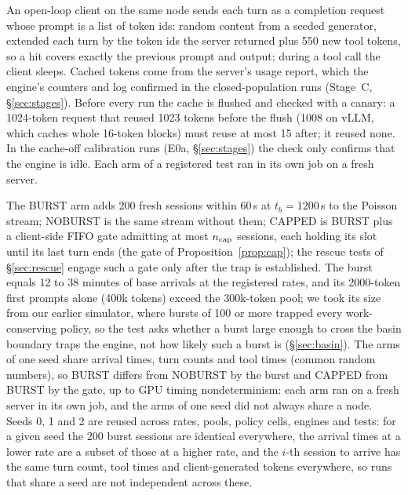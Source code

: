 An open-loop client on the same node sends each turn as a completion request whose prompt is a list of token ids: random content from a seeded generator, extended each turn by the token ids the server returned plus 550 new tool tokens, so a hit covers exactly the previous prompt and output; during a tool call the client sleeps. Cached tokens come from the server's usage report, which the engine's counters and log confirmed in the closed-population runs (Stage~C, \S\ref{sec:stages}). Before every run the cache is flushed and checked with a canary: a 1024-token request that reused 1023 tokens before the flush (1008 on vLLM, which caches whole 16-token blocks) must reuse at most 15 after; it reused none. In the cache-off calibration runs (E0a, \S\ref{sec:stages}) the check only confirms that the engine is idle. Each arm of a registered test ran in its own job on a fresh server.

The BURST arm adds 200 fresh sessions within 60\,s at $t_b=1200$\,s to the Poisson stream; NOBURST is the same stream without them; CAPPED is BURST plus a client-side FIFO gate admitting at most $n_{\mathrm{cap}}$ sessions, each holding its slot until its last turn ends (the gate of Proposition~\ref{prop:cap}); the rescue tests of \S\ref{sec:rescue} engage such a gate only after the trap is established. The burst equals 12 to 38 minutes of base arrivals at the registered rates, and its 2000-token first prompts alone (400k tokens) exceed the 300k-token pool; we took its size from our earlier simulator, where bursts of 100 or more trapped every work-conserving policy, so the test asks whether a burst large enough to cross the basin boundary traps the engine, not how likely such a burst is (\S\ref{sec:basin}). The arms of one seed share arrival times, turn counts and tool times (common random numbers), so BURST differs from NOBURST by the burst and CAPPED from BURST by the gate, up to GPU timing nondeterminism: each arm ran on a fresh server in its own job, and the arms of one seed did not always share a node. Seeds 0, 1 and 2 are reused across rates, pools, policy cells, engines and tests: for a given seed the 200 burst sessions are identical everywhere, the arrival times at a lower rate are a subset of those at a higher rate, and the $i$-th session to arrive has the same turn count, tool times and client-generated tokens everywhere, so runs that share a seed are not independent across these.

